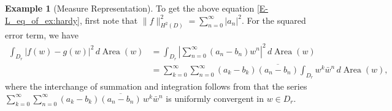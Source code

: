 \documentclass{amsart}
\numberwithin{equation}{section}
\DeclareMathOperator{\Area}{Area}
\theoremstyle{plain}
\theoremstyle{remark}
\theoremstyle{definition}
\newtheorem{example}[subsection]{Example}
\begin{document}
\begin{example}[Measure Representation]
To get the above equation \eqref{E-L_eq_of_ex:hardy}, first note that $\|f\|^2_{H^2(D)} = \sum_{n=0}^\infty |a_n|^2$.
For the squared error term, we have 
\begin{equation*}
\begin{split}
    \int_{D_r} |f(w) - g(w)|^2 \, d\Area(w) &= \int_{D_r} \left|\sum_{n=0}^\infty (a_n - b_n) w^n\right|^2 \, d\Area(w) \\
&= \sum_{k=0}^\infty \sum_{n=0}^\infty (a_k - b_k) \overline{(a_n - b_n)} \int_{D_r} w^k \bar{w}^n \, d\Area(w),
\end{split}
\end{equation*}
where the interchange of summation and integration follows from that the series $ \sum_{k=0}^\infty \sum_{n=0}^\infty (a_k - b_k)\overline{(a_n - b_n)}\, w^k \bar{w}^n$ is uniformly convergent in $w \in D_r$.

\end{example}
\end{document}
